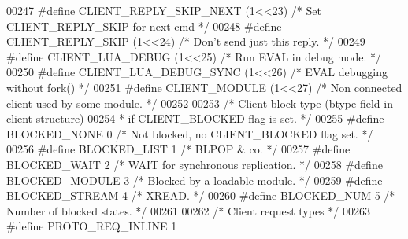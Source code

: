 \begin{DoxyCode}
{{{{{{00247 \textcolor{preprocessor}{#}\textcolor{preprocessor}{define} \textcolor{preprocessor}{CLIENT\_REPLY\_SKIP\_NEXT} \textcolor{preprocessor}{(}1\textcolor{preprocessor}{<<}23\textcolor{preprocessor}{)}  \textcolor{comment}{/* Set CLIENT\_REPLY\_SKIP for next cmd */}
00248 \textcolor{preprocessor}{#}\textcolor{preprocessor}{define} \textcolor{preprocessor}{CLIENT\_REPLY\_SKIP} \textcolor{preprocessor}{(}1\textcolor{preprocessor}{<<}24\textcolor{preprocessor}{)}  \textcolor{comment}{/* Don't send just this reply. */}
00249 \textcolor{preprocessor}{#}\textcolor{preprocessor}{define} \textcolor{preprocessor}{CLIENT\_LUA\_DEBUG} \textcolor{preprocessor}{(}1\textcolor{preprocessor}{<<}25\textcolor{preprocessor}{)}  \textcolor{comment}{/* Run EVAL in debug mode. */}
00250 \textcolor{preprocessor}{#}\textcolor{preprocessor}{define} \textcolor{preprocessor}{CLIENT\_LUA\_DEBUG\_SYNC} \textcolor{preprocessor}{(}1\textcolor{preprocessor}{<<}26\textcolor{preprocessor}{)}  \textcolor{comment}{/* EVAL debugging without fork() */}
00251 \textcolor{preprocessor}{#}\textcolor{preprocessor}{define} \textcolor{preprocessor}{CLIENT\_MODULE} \textcolor{preprocessor}{(}1\textcolor{preprocessor}{<<}27\textcolor{preprocessor}{)} \textcolor{comment}{/* Non connected client used by some module. */}
00252 
00253 \textcolor{comment}{/* Client block type (btype field in client structure)}
00254 \textcolor{comment}{ * if CLIENT\_BLOCKED flag is set. */}
00255 \textcolor{preprocessor}{#}\textcolor{preprocessor}{define} \textcolor{preprocessor}{BLOCKED\_NONE} 0    \textcolor{comment}{/* Not blocked, no CLIENT\_BLOCKED flag set. */}
00256 \textcolor{preprocessor}{#}\textcolor{preprocessor}{define} \textcolor{preprocessor}{BLOCKED\_LIST} 1    \textcolor{comment}{/* BLPOP & co. */}
00257 \textcolor{preprocessor}{#}\textcolor{preprocessor}{define} \textcolor{preprocessor}{BLOCKED\_WAIT} 2    \textcolor{comment}{/* WAIT for synchronous replication. */}
00258 \textcolor{preprocessor}{#}\textcolor{preprocessor}{define} \textcolor{preprocessor}{BLOCKED\_MODULE} 3  \textcolor{comment}{/* Blocked by a loadable module. */}
00259 \textcolor{preprocessor}{#}\textcolor{preprocessor}{define} \textcolor{preprocessor}{BLOCKED\_STREAM} 4  \textcolor{comment}{/* XREAD. */}
00260 \textcolor{preprocessor}{#}\textcolor{preprocessor}{define} \textcolor{preprocessor}{BLOCKED\_NUM} 5     \textcolor{comment}{/* Number of blocked states. */}
00261 
00262 \textcolor{comment}{/* Client request types */}
00263 \textcolor{preprocessor}{#}\textcolor{preprocessor}{define} \textcolor{preprocessor}{PROTO\_REQ\_INLINE} 1
}}}}}}
\end{DoxyCode}
